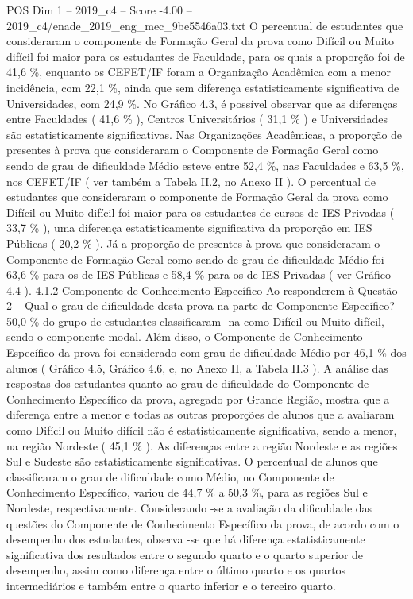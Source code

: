 \begin{textsample}{POS Dim 1 – 2019\_c4 – Score -4.00 – 2019\_c4/enade\_2019\_eng\_mec\_9be5546a03.txt}
O percentual de estudantes que consideraram o componente de Formação Geral da prova como Difícil ou Muito difícil foi maior para os estudantes de Faculdade, para os quais a proporção foi de 41,6 \%, enquanto os CEFET/IF foram a Organização Acadêmica com a menor incidência, com 22,1 \%, ainda que sem diferença estatisticamente significativa de Universidades, com 24,9 \%.
No Gráfico 4.3, é possível observar que as diferenças entre Faculdades ( 41,6 \% ), Centros Universitários ( 31,1 \% ) e Universidades são estatisticamente significativas.
Nas Organizações Acadêmicas, a proporção de presentes à prova que consideraram o Componente de Formação Geral como sendo de grau de dificuldade Médio esteve entre 52,4 \%, nas Faculdades e 63,5 \%, nos CEFET/IF ( ver também a Tabela II.2, no Anexo II ).
O percentual de estudantes que consideraram o componente de Formação Geral da prova como Difícil ou Muito difícil foi maior para os estudantes de cursos de IES Privadas ( 33,7 \% ), uma diferença estatisticamente significativa da proporção em IES Públicas ( 20,2 \% ).
Já a proporção de presentes à prova que consideraram o Componente de Formação Geral como sendo de grau de dificuldade Médio foi 63,6 \% para os de IES Públicas e 58,4 \% para os de IES Privadas ( ver Gráfico 4.4 ). 4.1.2 Componente de Conhecimento Específico Ao responderem à Questão 2 – Qual o grau de dificuldade desta prova na parte de Componente Específico? – 50,0 \% do grupo de estudantes classificaram -na como Difícil ou Muito difícil, sendo o componente modal.
Além disso, o Componente de Conhecimento Específico da prova foi considerado com grau de dificuldade Médio por 46,1 \% dos alunos ( Gráfico 4.5, Gráfico 4.6, e, no Anexo II, a Tabela II.3 ).
A análise das respostas dos estudantes quanto ao grau de dificuldade do Componente de Conhecimento Específico da prova, agregado por Grande Região, mostra que a diferença entre a menor e todas as outras proporções de alunos que a avaliaram como Difícil ou Muito difícil não é estatisticamente significativa, sendo a menor, na região Nordeste ( 45,1 \% ).
As diferenças entre a região Nordeste e as regiões Sul e Sudeste são estatisticamente significativas.
O percentual de alunos que classificaram o grau de dificuldade como Médio, no Componente de Conhecimento Específico, variou de 44,7 \% a 50,3 \%, para as regiões Sul e Nordeste, respectivamente.
Considerando -se a avaliação da dificuldade das questões do Componente de Conhecimento Específico da prova, de acordo com o desempenho dos estudantes, observa -se que há diferença estatisticamente significativa dos resultados entre o segundo quarto e o quarto superior de desempenho, assim como diferença entre o último quarto e os quartos intermediários e também entre o quarto inferior e o terceiro quarto.

\end{textsample}

